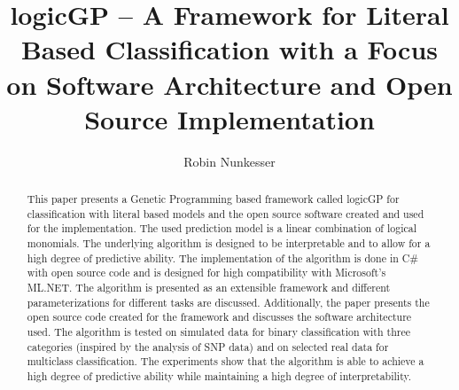 \documentclass[dvipsnames,format=sigconf,anonymous=false,review=false]{acmart}
\begin{document}
\title{logicGP -- A Framework for Literal Based Classification with a Focus on Software Architecture and Open Source Implementation} 


\author{Robin Nunkesser}




\begin{abstract}
  This paper presents a Genetic Programming based framework called logicGP for classification with literal based models and the open source software created and used for the implementation. The used prediction model is a linear combination of logical monomials. The underlying algorithm is designed to be interpretable and to allow for a high degree of predictive ability. The implementation of the algorithm is done in C\# with open source code and is designed for high compatibility with Microsoft's ML.NET. The algorithm is presented as an extensible framework and different parameterizations for different tasks are discussed. Additionally, the paper presents the open source code created for the framework and discusses the software architecture used. The algorithm is tested on simulated data for binary classification with three categories (inspired by the analysis of SNP data) and on selected real data for multiclass classification. The experiments show that the algorithm is able to achieve a high degree of predictive ability while maintaining a high degree of interpretability. %
\end{abstract}
\end{document}
